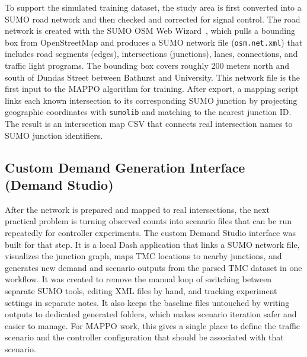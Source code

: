\documentclass{article}
\begin{document}
To support the simulated training dataset, the study area is first converted into a SUMO road network and then checked and corrected for signal control. The road network is created with the SUMO OSM Web Wizard~\cite{sumo_osm_wizard}, which pulls a bounding box from OpenStreetMap and produces a SUMO network file (\texttt{osm.net.xml}) that includes road segments (edges), intersections (junctions), lanes, connections, and traffic light programs. The bounding box covers roughly 200 meters north and south of Dundas Street between Bathurst and University. This network file is the first input to the MAPPO algorithm for training. After export, a mapping script links each known intersection to its corresponding SUMO junction by projecting geographic coordinates with \texttt{sumolib} and matching to the nearest junction ID. The result is an intersection map CSV that connects real intersection names to SUMO junction identifiers.

\subsection{Custom Demand Generation Interface (Demand Studio)}

After the network is prepared and mapped to real intersections, the next practical problem is turning observed counts into scenario files that can be run repeatedly for controller experiments. The custom Demand Studio interface was built for that step. It is a local Dash application that links a SUMO network file, visualizes the junction graph, maps TMC locations to nearby junctions, and generates new demand and scenario outputs from the parsed TMC dataset in one workflow. It was created to remove the manual loop of switching between separate SUMO tools, editing XML files by hand, and tracking experiment settings in separate notes. It also keeps the baseline files untouched by writing outputs to dedicated generated folders, which makes scenario iteration safer and easier to manage. For MAPPO work, this gives a single place to define the traffic scenario and the controller configuration that should be associated with that scenario.
\end{document}
